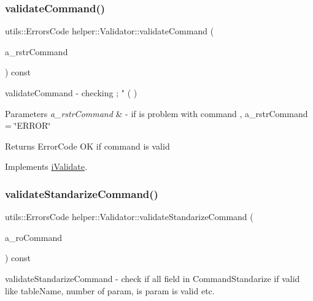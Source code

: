 \subsubsection{\texorpdfstring{validateCommand()}{validateCommand()}}
{\footnotesize\ttfamily utils\+::\+Errors\+Code helper\+::\+Validator\+::validate\+Command (\begin{DoxyParamCaption}\item[{std\+::string \&}]{a\+\_\+rstr\+Command }\end{DoxyParamCaption}) const\hspace{0.3cm}{\ttfamily [virtual]}}



validate\+Command -\/ checking ; " ( ) 


\begin{DoxyParams}{Parameters}
{\em a\+\_\+rstr\+Command} & -\/ if is problem with command , a\+\_\+rstr\+Command = \char`\"{}\+E\+R\+R\+O\+R\char`\"{} \\
\hline
\end{DoxyParams}
\begin{DoxyReturn}{Returns}
Error\+Code OK if command is valid 
\end{DoxyReturn}


Implements \mbox{\hyperlink{classi_validate}{i\+Validate}}.

\mbox{\label{classhelper_1_1_validator_a1a1f708a239f9bcec685cee12fa5eb6d}} 
\subsubsection{\texorpdfstring{validateStandarizeCommand()}{validateStandarizeCommand()}}
{\footnotesize\ttfamily utils\+::\+Errors\+Code helper\+::\+Validator\+::validate\+Standarize\+Command (\begin{DoxyParamCaption}\item[{\mbox{\hyperlink{structutils_1_1_command_standardize}{utils\+::\+Command\+Standardize}} \&}]{a\+\_\+ro\+Command }\end{DoxyParamCaption}) const\hspace{0.3cm}{\ttfamily [virtual]}}



validate\+Standarize\+Command -\/ check if all field in Command\+Standarize if valid like table\+Name, number of param, is param is valid etc. 


